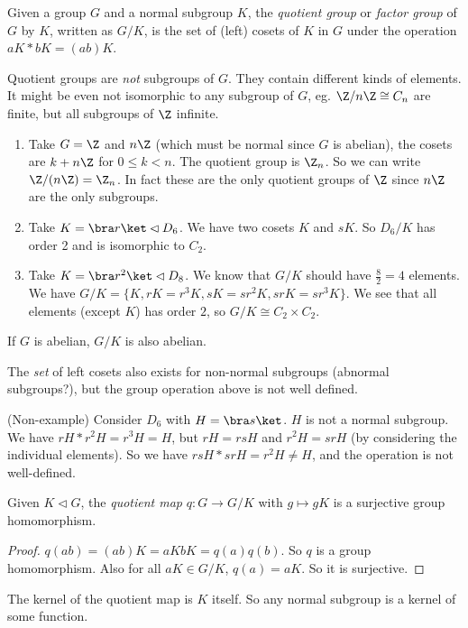 \documentclass[a4paper]{article}
\begin{document}
\begin{defi}
  Given a group $G$ and a normal subgroup $K$, the \emph{quotient group} or \emph{factor group} of $G$ by $K$, written as $G/K$, is the set of (left) cosets of $K$ in $G$ under the operation $aK*bK = (ab)K$.
\end{defi}

\note Quotient groups are \emph{not} subgroups of $G$. They contain different kinds of elements. It might be even not isomorphic to any subgroup of $G$, eg. $\Z/n\Z \cong C_n$ are finite, but all subgroups of $\Z$ infinite.

\begin{eg}\leavevmode
  \begin{enumerate}
    \item Take $G = \Z$ and $n\Z$ (which must be normal since $G$ is abelian), the cosets are $k + n\Z$ for $0 \leq k < n$. The quotient group is $\Z_n$. So we can write $\Z/(n\Z) = \Z_n$. In fact these are the only quotient groups of $\Z$ since $n\Z$ are the only subgroups.
    \item Take $K = \bra r\ket \lhd D_6$. We have two cosets $K$ and $sK$. So $D_6/K$ has order 2 and is isomorphic to $C_2$.
    \item Take $K = \bra r^2\ket \lhd D_8$. We know that $G/K$ should have $\frac{8}{2} = 4$ elements. We have $G/K = \{ K, rK = r^3 K, sK = sr^2K, srK = sr^3K\}$. We see that all elements (except $K$) has order $2$, so $G/K\cong C_2\times C_2$.
  \end{enumerate}
\end{eg}
\note If $G$ is abelian, $G/K$ is also abelian.

\note The \emph{set} of left cosets also exists for non-normal subgroups (abnormal subgroups?), but the group operation above is not well defined.

\begin{eg}
  (Non-example) Consider $D_6$ with $H = \bra s\ket$. $H$ is not a normal subgroup. We have $rH * r^2 H = r^3 H = H$, but $rH = rsH$ and $r^2H = srH$ (by considering the individual elements). So we have $rsH * srH = r^2 H\not= H$, and the operation is not well-defined.
\end{eg}

\begin{lemma}
  Given $K\lhd G$, the \emph{quotient map} $q: G\rightarrow G/K$ with $g\mapsto gK$ is a surjective group homomorphism.
\end{lemma}

\begin{proof}
  $q(ab) = (ab)K = aKbK = q(a)q(b)$. So $q$ is a group homomorphism. Also for all $aK \in G/K$, $q(a) = aK$. So it is surjective.
\end{proof}
\note The kernel of the quotient map is $K$ itself. So any normal subgroup is a kernel of some function.
\end{document}
